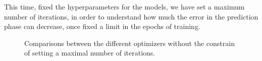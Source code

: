         This time, fixed the hyperparameters for the models, we have set a maximum number of iterations, in order to understand how much the error in the prediction phase can decrease, once fixed a limit in the epochs of training.


            \begin{figure}[t!]{}
                \centering
                \begin{subfigure}{0.45\textwidth}
                    \caption{}
                    \label{fig:cup_MSE_all_t}
                \end{subfigure}
                \begin{subfigure}{0.45\textwidth}
                    \caption{}
                    \label{fig:cup_MSE_all}
                \end{subfigure}
                \caption{Comparisons between the different optimizers without the constrain of setting a maximal
                number of iterations.}
                \label{fig:cup_MSE_all}
            \end{figure}

